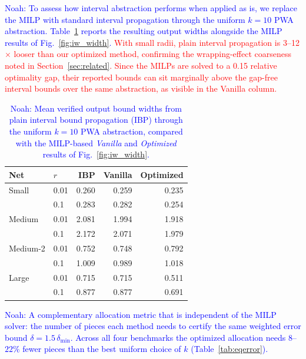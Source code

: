 \textcolor{blue}{Noah: To assess how interval abstraction performs when applied as is, we replace the MILP with standard interval propagation through the uniform $k=10$ PWA abstraction. Table~\ref{tab:ibp-baseline} reports the resulting output widths alongside the MILP results of Fig.~\ref{fig:iw_width}. \textcolor{red}{With small radii, plain interval propagation is 3--12$\times$ looser than our optimized method, confirming the wrapping-effect coarseness noted in Section~\ref{sec:related}.} \textcolor{red}{Since the MILPs are solved to a 0.15 relative optimality gap, their reported bounds can sit marginally above the gap-free interval bounds over the same abstraction, as visible in the Vanilla column.}}

  \begin{table}[t]
    \caption{\textcolor{blue}{Noah: Mean verified output bound widths from plain interval bound
    propagation (IBP) through the uniform $k{=}10$ PWA abstraction, compared
    with the MILP-based \emph{Vanilla} and \emph{Optimized} results of
    Fig.~\ref{fig:iw_width}.}}
    \label{tab:ibp-baseline}
    \centering
    \begin{tabular}{llrrr}
    \hline
    Net & $r$ & IBP & Vanilla & Optimized \\
    \hline
    Small    & 0.01 & 0.260 & 0.259 & 0.235 \\
             & 0.1  & 0.283 & 0.282 & 0.254 \\
    \hline
    Medium   & 0.01 & 2.081 & 1.994 & 1.918 \\
             & 0.1  & 2.172 & 2.071 & 1.979 \\
    \hline
    Medium-2 & 0.01 & 0.752 & 0.748 & 0.792 \\
             & 0.1  & 1.009 & 0.989 & 1.018 \\
    \hline
    Large    & 0.01 & 0.715 & 0.715 & 0.511 \\
             & 0.1  & 0.877 & 0.877 & 0.691 \\
    \hline
    \end{tabular}
  \end{table}

\textcolor{blue}{Noah: A complementary allocation metric that is independent of the MILP solver: the number of pieces each method needs to certify the same weighted error bound $\delta = 1.5\,\delta_{\min}$. Across all four benchmarks the optimized allocation needs $8$--$22\%$ fewer pieces than the best uniform choice of $k$ (Table~\ref{tab:eqerror}).}

